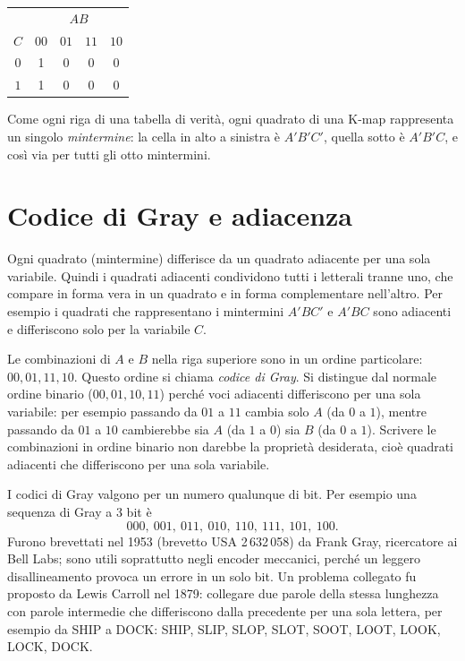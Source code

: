 \documentclass[11pt,a4paper]{article}
\begin{document}
\begin{center}
\begin{tabular}{c|cccc}
 & \multicolumn{4}{c}{$AB$}\\
$C$ & $00$ & $01$ & $11$ & $10$ \\
\midrule
$0$ & 1 & 0 & 0 & 0 \\
$1$ & 1 & 0 & 0 & 0 \\
\end{tabular}
\end{center}

Come ogni riga di una tabella di verità, ogni quadrato di una K-map rappresenta un singolo \emph{mintermine}: la cella in alto a sinistra è $A'B'C'$, quella sotto è $A'B'C$, e così via per tutti gli otto mintermini.

\section{Codice di Gray e adiacenza}

Ogni quadrato (mintermine) differisce da un quadrato adiacente per una sola variabile. Quindi i quadrati adiacenti condividono tutti i letterali tranne uno, che compare in forma vera in un quadrato e in forma complementare nell'altro. Per esempio i quadrati che rappresentano i mintermini $A'BC'$ e $A'BC$ sono adiacenti e differiscono solo per la variabile $C$.

Le combinazioni di $A$ e $B$ nella riga superiore sono in un ordine particolare: $00, 01, 11, 10$. Questo ordine si chiama \emph{codice di Gray}. Si distingue dal normale ordine binario ($00, 01, 10, 11$) perché voci adiacenti differiscono per una sola variabile: per esempio passando da $01$ a $11$ cambia solo $A$ (da $0$ a $1$), mentre passando da $01$ a $10$ cambierebbe sia $A$ (da $1$ a $0$) sia $B$ (da $0$ a $1$). Scrivere le combinazioni in ordine binario non darebbe la proprietà desiderata, cioè quadrati adiacenti che differiscono per una sola variabile.

\begin{osservazione}
I codici di Gray valgono per un numero qualunque di bit. Per esempio una sequenza di Gray a $3$ bit è
\[
000,\ 001,\ 011,\ 010,\ 110,\ 111,\ 101,\ 100.
\]
Furono brevettati nel 1953 (brevetto USA 2\,632\,058) da Frank Gray, ricercatore ai Bell Labs; sono utili soprattutto negli encoder meccanici, perché un leggero disallineamento provoca un errore in un solo bit. Un problema collegato fu proposto da Lewis Carroll nel 1879: collegare due parole della stessa lunghezza con parole intermedie che differiscono dalla precedente per una sola lettera, per esempio da SHIP a DOCK: SHIP, SLIP, SLOP, SLOT, SOOT, LOOT, LOOK, LOCK, DOCK.
\end{osservazione}
\end{document}
